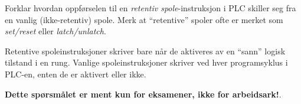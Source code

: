 

Forklar hvordan oppførselen til en {\it retentiv spole}-instruksjon i PLC skiller seg fra en vanlig (ikke-retentiv) spole. Merk at ``retentive'' spoler ofte er merket som {\it set/reset} eller {\it latch/unlatch}.







Retentive spoleinstruksjoner skriver bare når de aktiveres av en ``sann'' logisk tilstand i en rung. Vanlige spoleinstruksjoner skriver ved hver programsyklus i PLC-en, enten de er aktivert eller ikke.







{\bf Dette spørsmålet er ment kun for eksamener, ikke for arbeidsark!}.


